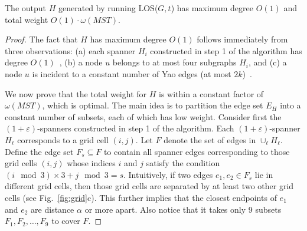 \documentclass{llncs}
\newcommand{\e}{\varepsilon}
\newcommand{\alg}{{\sc LOS}}
\newcommand{\w}{\omega}
\begin{document}
\begin{theorem}
The output $H$ generated by running \alg($G, t$) has maximum degree $O(1)$ and total weight $O(1) \cdot \w(MST)$.
\label{thm:degreeweight}
\end{theorem}
\begin{proof}
The fact that $H$ has maximum degree $O(1)$ follows immediately from three observations:
(a) each spanner $H_i$ constructed in step 1 of the algorithm has degree $O(1)$~\cite{DN97},
(b) a node $u$ belongs to at most four subgraphs $H_i$, and
(c) a node $u$ is incident to a constant number of Yao edges (at most $2k$)~\cite{li02sparse}.

We now prove that the total weight for $H$ is within a constant factor of $\w(MST)$,
which is optimal. The main idea is to partition the edge set $E_H$ into a constant
number of subsets, each of which has low weight.
Consider first the $(1+\e)$-spanners constructed in step 1 of the algorithm.
Each $(1+\e)$-spanner $H_\ell$ corresponds to a grid cell $(i, j)$. Let $F$ denote
the set of edges in $\cup_\ell H_\ell$. Define the edge
set $F_s \subseteq F$ to contain all spanner edges corresponding to those grid cells $(i, j)$
whose indices $i$ and $j$ satisfy the condition $(i \mod 3) \times 3+ j \mod 3 = s$.
Intuitively, if two edges $e_1, e_2 \in F_{s}$ lie in different grid cells, then
those grid cells are separated by at least two other grid cells (see Fig.~\ref{fig:grid}c).
This further implies that the closest endpoints of $e_1$ and $e_2$ are distance $\alpha$
or more apart. Also notice that it takes only 9 subsets $F_1, F_2, \ldots, F_9$ to cover
$F$.


\end{proof}
\end{document}
